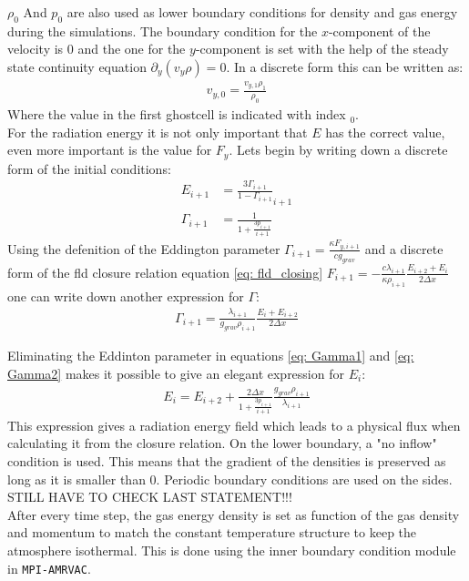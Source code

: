 $\rho_0$ And $p_0$ are also used as lower boundary conditions for density and gas energy during the simulations. The  boundary condition for the $x$-component of the velocity is $0$ and the one for the $y$-component is set with the help of the steady state continuity equation $\partial_y(v_y \rho) = 0$. In a discrete form this can be written as:
\begin{align}
v_{y,0} = \frac{v_{y,1} \rho_1}{\rho_0}
\end{align}
Where the value in the first ghostcell is indicated with index $_0$.\\
For the radiation energy it is not only important that $E$ has the correct value, even more important is the value for $F_y$. Lets begin by writing down a discrete form of the initial conditions:
\begin{align}
E_{i+1} &= \frac{3 \Gamma_{i+1}}{1-\Gamma_{i+1}}_{i+1} \\
\Gamma_{i+1} &= \frac{1}{1 + \frac{3 p_{i+1}}{i+1}} \label{eq: Gamma1}
\end{align}
Using the defenition of the Eddington parameter $\Gamma_{i+1} = \frac{\kappa F_{y,i+1}}{c g_{grav}}$ and a discrete form of the fld closure relation equation \eqref{eq: fld_closing} $F_{i+1} = -\frac{c \lambda_{i+1}}{\kappa \rho_{i+1}} \frac{E_{i+2} + E_{i}}{2 \Delta x}$ one can write down another expression for $\Gamma$:
\begin{align}
\Gamma_{i+1} = \frac{\lambda_{i+1}}{g_{grav}\rho_{i+1}}\frac{E_i + E_{i+2}}{2 \Delta x} \label{eq: Gamma2}
\end{align}

Eliminating the Eddinton parameter in equations \ref{eq: Gamma1} and \eqref{eq: Gamma2} makes it possible to give an elegant expression for $E_i$:
\begin{align}
E_i = E_{i+2} + \frac{2 \Delta x}{1 + \frac{3 p_{i+1}}{i+1}}  \frac{g_{grav} \rho_{i+1}}{\lambda_{i+1}}  
\end{align}
This expression gives a radiation energy field which leads to a physical flux when calculating it from the closure relation. On the lower boundary, a "no inflow" condition is used. This means that the gradient of the densities is preserved as long as it is smaller than $0$. Periodic boundary conditions are used on the sides. \\ STILL HAVE TO CHECK LAST STATEMENT!!!\\

After every time step, the gas energy density is set as function of the gas density and momentum to match the constant temperature structure to keep the atmosphere isothermal. This is done using the inner boundary condition module in \texttt{MPI-AMRVAC}.\\


